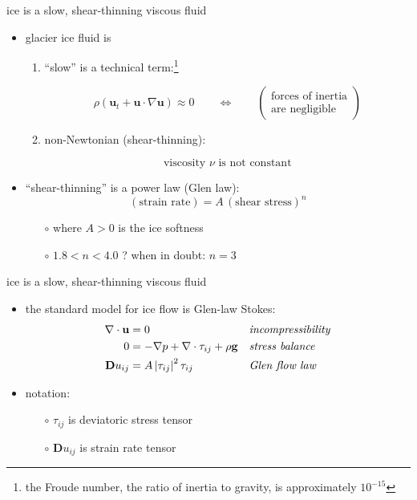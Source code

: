 \documentclass[hide notes,intlimits]{beamer}
\begin{document}
\begin{frame}{ice is a slow, shear-thinning viscous fluid}

\begin{itemize}
\item glacier ice fluid is
  \begin{enumerate}
  \item ``slow'' is a technical term:\footnote{the Froude number, the ratio of inertia to gravity, is approximately $10^{-15}$}

\vspace{-3mm}
    $$\rho \left(\mathbf{u}_t + \mathbf{u}\cdot\nabla \mathbf{u}\right) \approx 0 \qquad \iff \qquad \begin{pmatrix} \text{forces of inertia} \\ \text{are negligible} \end{pmatrix}$$
  \item non-Newtonian (shear-thinning):

\vspace{-2mm}
    $$\text{viscosity $\nu$ is not constant}$$
  \end{enumerate}

\item ``shear-thinning'' is a power law (Glen law):
  $$(\text{strain rate}) = A\, (\text{shear stress})^n$$

\vspace{-2mm}
  \begin{itemize}
  \item[$\circ$] where $A>0$ is the ice softness
  \item[$\circ$] $1.8 < n < 4.0$ ?  \quad when in doubt: \alert{$n=3$}
  \end{itemize}
\end{itemize}
\end{frame}


\begin{frame}{ice is a slow, shear-thinning viscous fluid}

\begin{itemize}
\item the \alert{standard model for ice flow} is Glen-law Stokes:
\begin{align*}
\nabla \cdot \mathbf{u} &= 0 &&\text{\emph{incompressibility}} \\
0 &= - \nabla p + \nabla \cdot \tau_{ij} + \rho \mathbf{g} &&\text{\emph{stress balance}} \\
\mathbf{D}u_{ij} &= A \left|\tau_{ij}\right|^2 \tau_{ij} &&\text{\emph{Glen flow law}}
\end{align*}
\item notation:
  \begin{itemize}
  \item[$\circ$] $\tau_{ij}$ is deviatoric stress tensor
  \item[$\circ$] $\mathbf{D}u_{ij}$ is strain rate tensor
  \end{itemize}
\end{itemize}
\end{frame}
\end{document}
